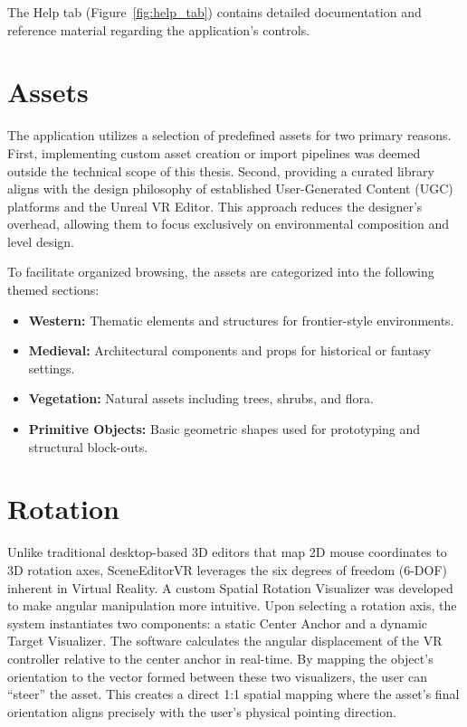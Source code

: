 \documentclass[inscr,ack,preface]{dithesis}
\begin{document}
The Help tab (Figure~\ref{fig:help_tab}) contains detailed documentation and reference material regarding the application's controls.

\section{Assets}

The application utilizes a selection of predefined assets for two primary reasons. First, implementing custom asset
creation or import pipelines was deemed outside the technical scope of this thesis. Second, providing a curated library aligns
with the design philosophy of established User-Generated Content (UGC) platforms and the Unreal VR Editor. This approach reduces
the designer's overhead, allowing them to focus exclusively on environmental composition and level design.

To facilitate organized browsing, the assets are categorized into the following themed sections:

\begin{itemize}
  \item \textbf{Western:} Thematic elements and structures for frontier-style environments.
  \item \textbf{Medieval:} Architectural components and props for historical or fantasy settings.
  \item \textbf{Vegetation:} Natural assets including trees, shrubs, and flora.
  \item \textbf{Primitive Objects:} Basic geometric shapes used for prototyping and structural block-outs.
\end{itemize}

\section{Rotation}

Unlike traditional desktop-based 3D editors that map 2D mouse coordinates to 3D rotation axes, SceneEditorVR
leverages the six degrees of freedom (6-DOF) inherent in Virtual Reality. A custom Spatial Rotation
Visualizer was developed to make angular manipulation more intuitive. Upon selecting a rotation axis, the system instantiates two components:
a static Center Anchor and a dynamic Target Visualizer. The software calculates the angular displacement
of the VR controller relative to the center anchor in real-time. By mapping the object’s orientation to the vector formed between
these two visualizers, the user can ``steer'' the asset. This creates a direct 1:1 spatial mapping where the asset’s final orientation
aligns precisely with the user’s physical pointing direction.
\end{document}

